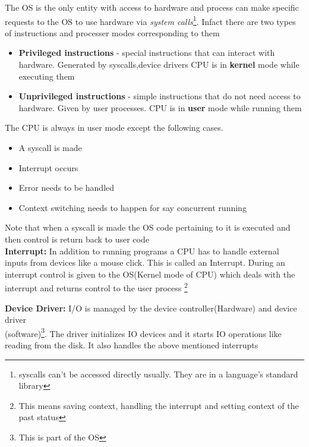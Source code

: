 \documentclass[12pt]{article}
\begin{document}
    The OS is the only entity with access to hardware and process can make specific requests to the OS to use hardware
    via \textit{system calls}\footnote{syscalls can't be accessed directly usually. They are in a language's standard library}. Infact there are two types of instructions and processer modes corresponding to them

    \begin{itemize}[topsep=0pt, partopsep=0pt, itemsep=0pt, parsep=0pt]
        \item \textbf{Privileged instructions} - special instructions that can interact with hardware. Generated by syscalls,device drivers
        CPU is in \textbf{kernel} mode while executing them 
        \item \textbf{Unprivileged instructions} - simple instructions that do not need access to hardware. Given by user processes. CPU is in \textbf{user} mode while running them
    \end{itemize}

    The CPU is always in user mode except the following cases.
    \begin{itemize}[topsep=0pt, partopsep=0pt, itemsep=0pt, parsep=0pt]
        \item A syscall is made
        \item Interrupt occurs
        \item Error needs to be handled 
        \item Context switching needs to happen for say concurrent running
    \end{itemize}
    
    Note that when a syscall is made the OS code pertaining to it is executed and then control is return back to user code
    \\\textbf{Interrupt:} In addition to running programs a CPU has to handle external inputs from devices like a mouse click.
    This is called an Interrupt. During an interrupt control is given to the OS(Kernel mode of CPU) which deals with the interrupt and returns
    control to the user process \footnote{This means saving context, handling the interrupt and setting context of the past status}


    \noindent\textbf{Device Driver:} I/O is managed by the device controller(Hardware) and device driver\\(software)\footnote{This is part of the OS}.
    The driver initializes IO devices and it starts IO operations like reading from the disk. It also handles the above mentioned interrupts
\end{document}

